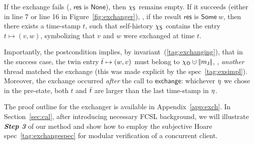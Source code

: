 If the exchange fails (\ie, $\mathsf{res}$ is $\mathsf{None}$), then
$\chi_{\mathsf{S}}$ remains empty.  If it succeeds (either in line 7 or line 16
in Figure~\ref{fig:exchanger}), \ie, if the result $\mathsf{res}$ is
$\mathsf{Some}\ w$, then there exists a time-stamp $t$, such that
self-history $\chi_{\mathsf{S}}$ contains the entry $t \mapsto (v, w)$,
symbolizing that $v$ and $w$ were exchanged at time $t$.

Importantly, the postcondition implies, by
invariant~(\ref{tag:exchanging}), that in the success case, the twin
entry $\bar{t} \mapsto (w, v)$ must belong to $\histo \hunion
\mygather{\pending}$, \ie, \emph{another} thread matched the exchange
(this was made explicit by the spec~\eqref{tag:exsimpl}).
Moreover, the exchange occurred \emph{after} the call to
$\mathsf{exchange}$: whichever $\eta$ we chose in the pre-state, both
$t$ and $\bar{t}$ are larger than the last time-stamp in $\eta$.

The proof outline for the exchanger is available in
Appendix~\ref{app:exch}.
%
In Section~\ref{sec:cal}, after introducing necessary FCSL background,
we will illustrate \textbf{\emph{Step 3}} of our method and show how
to employ the subjective Hoare spec~\eqref{tag:exchangespec} for
modular verification of a concurrent client.


